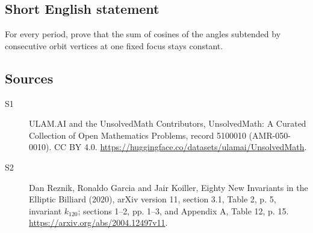 \documentclass[11pt]{article}
\begin{document}
\subsection{Short English statement}
For every period, prove that the sum of cosines of the angles subtended by consecutive orbit vertices at one fixed focus stays constant.
\subsection{Sources}
\begin{description}
\item[\hypertarget{source:5100010:1}{S1}] ULAM.AI and the UnsolvedMath Contributors, UnsolvedMath: A Curated Collection of Open Mathematics Problems, record 5100010 (AMR-050-0010). CC BY 4.0. \url{https://huggingface.co/datasets/ulamai/UnsolvedMath}.
\item[\hypertarget{source:5100010:2}{S2}] Dan Reznik, Ronaldo Garcia and Jair Koiller, Eighty New Invariants in the Elliptic Billiard (2020), arXiv version 11, section 3.1, Table 2, p. 5, invariant $k_{120}$; sections 1--2, pp. 1--3, and Appendix A, Table 12, p. 15. \url{https://arxiv.org/abs/2004.12497v11}.
\end{description}
\label{end:5100010}
\end{document}
